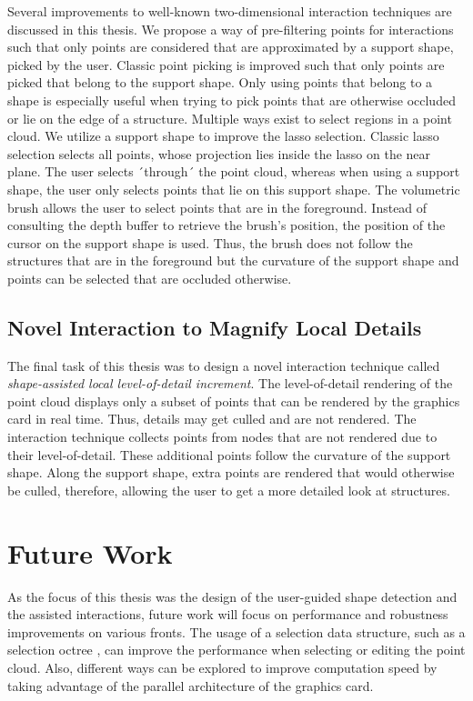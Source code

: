 Several improvements to well-known two-dimensional interaction techniques are discussed in this thesis. We propose a way of pre-filtering points for interactions such that only points are considered that are approximated by a support shape, picked by the user. Classic point picking is improved such that only points are picked that belong to the support shape. Only using points that belong to a shape is especially useful when trying to pick points that are otherwise occluded or lie on the edge of a structure. Multiple ways exist to select regions in a point cloud. We utilize a support shape to improve the lasso selection. Classic lasso selection selects all points, whose projection lies inside the lasso on the near plane. The user selects ´through´ the point cloud, whereas when using a support shape, the user only selects points that lie on this support shape. The volumetric brush allows the user to select points that are in the foreground. Instead of consulting the depth buffer to retrieve the brush's position, the position of the cursor on the support shape is used. Thus, the brush does not follow the structures that are in the foreground but the curvature of the support shape and points can be selected that are occluded otherwise. 


\subsection*{Novel Interaction to Magnify Local Details}

The final task of this thesis was to design a novel interaction technique called \textit{shape-assisted local level-of-detail increment}. The level-of-detail rendering of the point cloud displays only a subset of points that can be rendered by the graphics card in real time. Thus, details may get culled and are not rendered. The interaction technique collects points from nodes that are not rendered due to their level-of-detail. These additional points follow the curvature of the support shape. Along the support shape, extra points are rendered that would otherwise be culled, therefore, allowing the user to get a more detailed look at structures. 


\section{Future Work}

As the focus of this thesis was the design of the user-guided shape detection and the assisted interactions, future work will focus on performance and robustness improvements on various fronts. The usage of a selection data structure, such as a selection octree \cite{scheiblauer2011out}, can improve the performance when selecting or editing the point cloud. Also, different ways can be explored to improve computation speed by taking advantage of the parallel architecture of the graphics card. 

